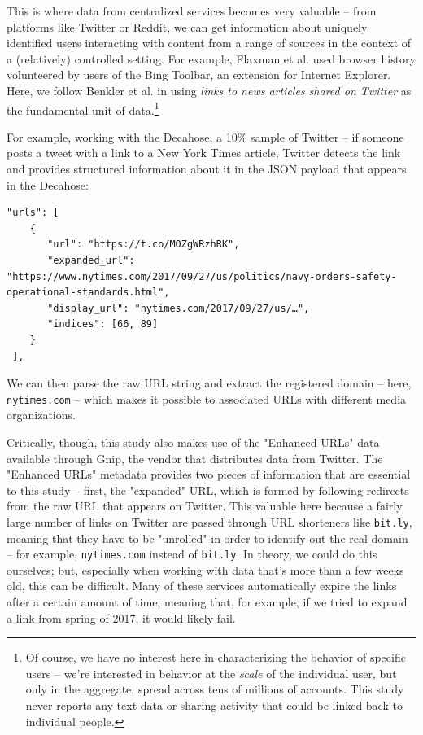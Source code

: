 \documentclass{scrartcl}
\begin{document}
This is where data from centralized services becomes very valuable -- from platforms like Twitter or Reddit, we can get information about uniquely identified users interacting with content from a range of sources in the context of a (relatively) controlled setting. For example, Flaxman et al. used browser history volunteered by users of the Bing Toolbar, an extension for Internet Explorer. Here, we follow Benkler et al. in using \textit{links to news articles shared on Twitter} as the fundamental unit of data.\footnote{Of course, we have no interest here in characterizing the behavior of specific users -- we're interested in behavior at the \textit{scale} of the individual user, but only in the aggregate, spread across tens of millions of accounts. This study never reports any text data or sharing activity that could be linked back to individual people.}

For example, working with the Decahose, a 10\% sample of Twitter -- if someone posts a tweet with a link to a New York Times article, Twitter detects the link and provides structured information about it in the JSON payload that appears in the Decahose:

\begin{lstlisting}
"urls": [
    {
       "url": "https://t.co/MOZgWRzhRK",
       "expanded_url": "https://www.nytimes.com/2017/09/27/us/politics/navy-orders-safety-operational-standards.html",
       "display_url": "nytimes.com/2017/09/27/us/…",
       "indices": [66, 89]
    }
 ],
\end{lstlisting}

We can then parse the raw URL string and extract the registered domain -- here, \texttt{nytimes.com} -- which makes it possible to associated URLs with different media organizations.

Critically, though, this study also makes use of the "Enhanced URLs" data available through Gnip, the vendor that distributes data from Twitter. The "Enhanced URLs" metadata provides two pieces of information that are essential to this study -- first, the "expanded" URL, which is formed by following redirects from the raw URL that appears on Twitter. This valuable here because a fairly large number of links on Twitter are passed through URL shorteners like \texttt{bit.ly}, meaning that they have to be "unrolled" in order to identify out the real domain -- for example, \texttt{nytimes.com} instead of \texttt{bit.ly}. In theory, we could do this ourselves; but, especially when working with data that's more than a few weeks old, this can be difficult. Many of these services automatically expire the links after a certain amount of time, meaning that, for example, if we tried to expand a link from spring of 2017, it would likely fail.
\end{document}
